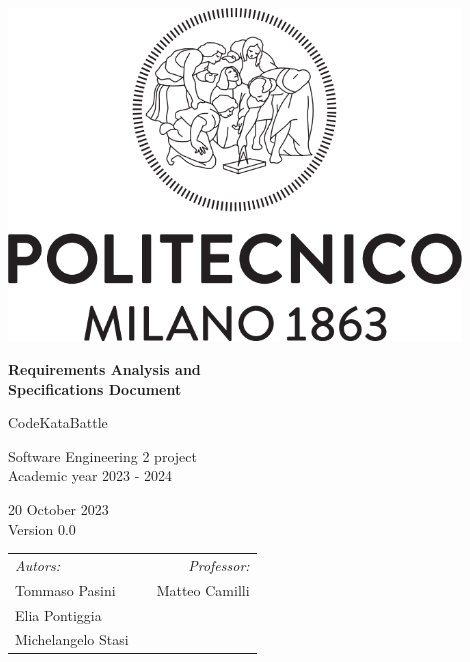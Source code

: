 \begin{titlepage}
    \begin{center}
        \includegraphics*[width=0.9\textwidth]{images/PoliMi_Logo.png}

        \vspace*{1cm}
        \textbf{\huge Requirements Analysis and\\Specifications Document}

        \vspace{0.5cm}
        \LARGE CodeKataBattle

        \vspace{1.5cm}
        \normalsize Software Engineering 2 project\\
        Academic year 2023 - 2024

        \vspace{0.5cm}
        20 October 2023\\
        Version 0.0

        \vspace{1.5cm}
        \small
        \begin{table}[b]
            \begin{tabular}{l p{5.5cm} l}
                \textit{Autors:}   &  & \multicolumn{1}{r}{\textit{Professor:}} \\
                Tommaso Pasini     &  & \multicolumn{1}{r}{Matteo Camilli}      \\
                Elia Pontiggia     &  & \textbf{}                               \\
                Michelangelo Stasi &  & \textbf{}
            \end{tabular}
        \end{table}

    \end{center}
\end{titlepage}